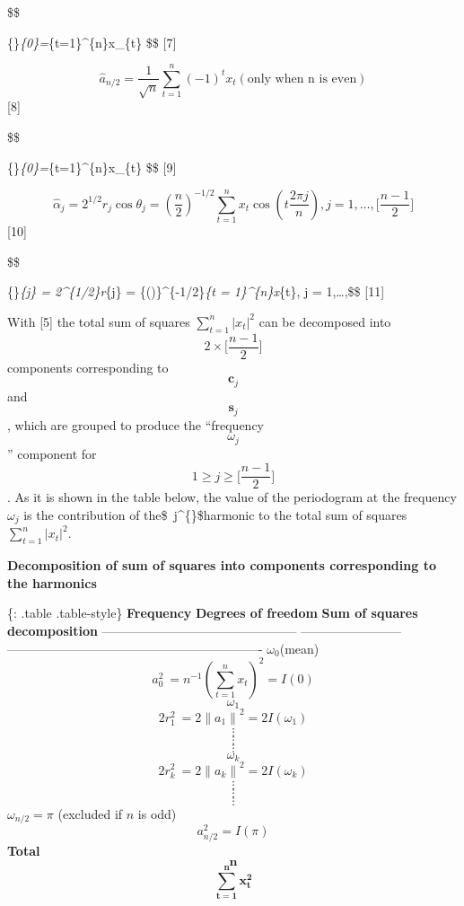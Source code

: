 \documentclass[
  letterpaper,
  DIV=11,
  numbers=noendperiod]{scrreprt}
\begin{document}
\$\$

\{\}\emph{\{0\}=\sum}\{t=1\}\^{}\{n\}x\_\{t\}
\$\$ {[}7{]}

\[
  {\widehat{a}}_{n/2}=\frac{1}{\sqrt{n}}\sum_{t=1}^{n}{(-1)}^{t}x_{t}(   \text{only when n is even})
  \] {[}8{]}

\$\$

\{\}\emph{\{0\}=\sum}\{t=1\}\^{}\{n\}x\_\{t\}
\$\$ {[}9{]}

\[
  {\widehat{\alpha}}_{j} = 2^{1/2}r_{j}\cos{\theta_{j}} = {(\frac{n}{2})}^{- 1/2}\sum_{t = 1}^{n}x_{t}\cos{(t\frac{2\pi j}{n})}, j   = 1,\ldots,\lbrack\frac{n - 1}{2}\rbrack
  \] {[}10{]}

\$\$

\{\widehat{\beta}\}\emph{\{j\} = 2\^{}\{1/2\}r}\{j\} =
\{()\}\^{}\{-1/2\}\sum\emph{\{t =
1\}\^{}\{n\}x}\{t\}, j =
1,\ldots,\lbrack{}\rbrack \$\$ {[}11{]}

With {[}5{]} the total sum of squares \(\sum_{t = 1}^{n}| x_{t} |^{2}\)
can be decomposed into \[2 \times \lbrack\frac{n - 1}{2}\rbrack\]
components corresponding to \[\mathbf{c}_{j}\] and \[\mathbf{s}_{j}\],
which are grouped to produce the ``frequency \[ω_{j}\]'' component for
\[1 \geq j \geq \lbrack\frac{n - 1}{2}\rbrack\]. As it is shown in the
table below, the value of the periodogram at the frequency
\(\omega_{j}\) is the contribution of the\$~j\^{}\{\}\$harmonic
to the total sum of squares \(\sum_{t = 1}^{n}| x_{t} |^{2}\).

\textbf{Decomposition of sum of squares into components corresponding to
the harmonics}

\{: .table .table-style\} \textbar{}\textbf{Frequency}
\textbar{}\textbf{Degrees of freedom} \textbar{}\textbf{Sum of squares
decomposition}\textbar{}
\textbar-----------------------------------------------
\textbar------------------------
\textbar-------------------------------------------------------------\textbar{}
\textbar{}\(\omega_{0}\)(mean) 
\textbar{}\[{a_{0}^{2}}_{\ }=n^{- 1}(\sum_{t=1}^{n}x_{t})^{2} = I( 0)\]\textbar{}
\textbar{}\[\omega_{1}\] 
\textbar{}\[{2r_{1}^{2}}_{\ } = 2{\|a_{1}\|}^{2} = 2I(\omega_{1})\]\textbar{}
\textbar{}\[\vdots\] \textbar{}\[\vdots\] \textbar{}\[\vdots\]\textbar{}
\textbar{}\[\omega_{k}\] 
\textbar{}\[{2r_{k}^{2}}_{\ } = 2{\|a_{k}\|}^{2} = 2I(\omega_{k})\]\textbar{}
\textbar{}\[\vdots\] \textbar{}\[\vdots\] \textbar{}\[\vdots\]\textbar{}
\textbar{}\(\omega_{n/2} = \pi\) (excluded if \(n\) is odd) 
\textbar{}\[a_{n/2}^{2} = I(\pi)\]\textbar{} \textbar{}\textbf{Total}
\textbar{}\[\mathbf{n}\]
\textbar{}\[\sum_{\mathbf{t = 1}}^{\mathbf{n}}\mathbf{x}_{\mathbf{t}}^{\mathbf{2}}\]\textbar{}
\end{document}
